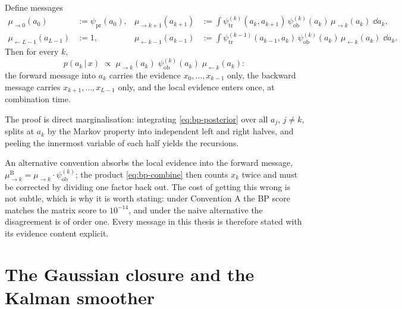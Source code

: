 \begin{proposition}\label{prop:bp-convA}
Define messages
\begin{align}
  \mu_{\to 0}(a_0) &:= \psi_{\mathrm{pr}}(a_0),
  &
  \mu_{\to k+1}(a_{k+1}) &:= \int
    \psi^{(k)}_{\mathrm{tr}}(a_k, a_{k+1})\,
    \psi^{(k)}_{\mathrm{ob}}(a_k)\,
    \mu_{\to k}(a_k)\; \dd a_k ,
  \label{eq:bp-fwd}\\
  \mu_{\leftarrow L-1}(a_{L-1}) &:= 1,
  &
  \mu_{\leftarrow k-1}(a_{k-1}) &:= \int
    \psi^{(k-1)}_{\mathrm{tr}}(a_{k-1}, a_k)\,
    \psi^{(k)}_{\mathrm{ob}}(a_k)\,
    \mu_{\leftarrow k}(a_k)\; \dd a_k .
  \label{eq:bp-bwd}
\end{align}
Then for every $k$,
\begin{equation}
  p(a_k \,|\, x) \;\propto\;
  \mu_{\to k}(a_k)\;
  \psi^{(k)}_{\mathrm{ob}}(a_k)\;
  \mu_{\leftarrow k}(a_k) :
  \label{eq:bp-combine}
\end{equation}
the forward message into $a_k$ carries the evidence
$x_0, \dots, x_{k-1}$ only, the backward message carries
$x_{k+1}, \dots, x_{L-1}$ only, and the local evidence enters once, at
combination time.
\end{proposition}

The proof is direct marginalisation: integrating \eqref{eq:bp-posterior}
over all $a_j$, $j \neq k$, splits at $a_k$ by the Markov property into
independent left and right halves, and peeling the innermost variable of
each half yields the recursions.

\begin{remark}\label{rmk:bp-trap}
An alternative convention absorbs the local evidence into the forward
message, $\mu^{\mathrm{B}}_{\to k} = \mu_{\to k} \cdot
\psi^{(k)}_{\mathrm{ob}}$; the product \eqref{eq:bp-combine} then counts
$x_k$ twice and must be corrected by dividing one factor back out. The cost
of getting this wrong is not subtle, which is why it is worth stating: under
Convention A the BP score matches the matrix score to $10^{-14}$, and under the
naive alternative the disagreement is of order one. Every message in this thesis
is therefore stated with its evidence content explicit.
\end{remark}

\section{The Gaussian closure and the Kalman smoother}
\label{sec:bp-gaussian}\label{sec:bp-kalman}

